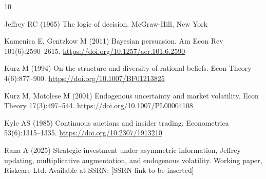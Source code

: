 \documentclass[12pt,a4paper]{article}
\newcommand{\1}{\mathbf{1}}
\begin{document}
\begin{thebibliography}{10}

Jeffrey RC (1965) The logic of decision.
McGraw-Hill, New York

Kamenica E, Gentzkow M (2011) Bayesian persuasion.
Am Econ Rev 101(6):2590--2615.
\url{https://doi.org/10.1257/aer.101.6.2590}

Kurz M (1994) On the structure and diversity of rational beliefs.
Econ Theory 4(6):877--900.
\url{https://doi.org/10.1007/BF01213825}

Kurz M, Motolese M (2001) Endogenous uncertainty and market
volatility. Econ Theory 17(3):497--544.
\url{https://doi.org/10.1007/PL00004108}

Kyle AS (1985) Continuous auctions and insider trading.
Econometrica 53(6):1315--1335.
\url{https://doi.org/10.2307/1913210}

Rana A (2025) Strategic investment under asymmetric information,
Jeffrey updating, multiplicative augmentation, and endogenous
volatility. Working paper, Riskcare Ltd. Available at SSRN:
[SSRN link to be inserted]

\end{thebibliography}
\end{document}
